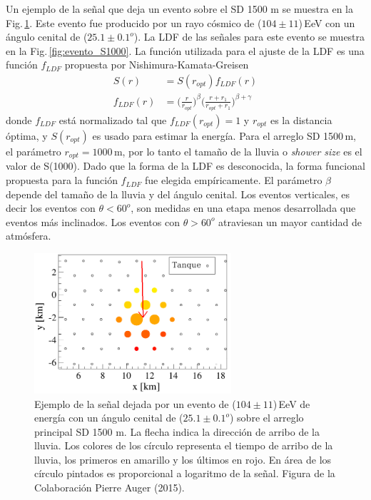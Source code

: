 Un ejemplo de la señal que deja un evento sobre el SD 1500 m se muestra en la Fig.\,\ref{fig:evento_sd}. Este evento fue producido por un rayo cósmico de ($104\pm11$)\,EeV con un ángulo cenital de ($25.1\pm0.1 ^o$). La LDF de las señales para este evento se muestra en la Fig.\,\ref{fig:evento_S1000}. La función utilizada para el ajuste de la LDF es una función  $f_{LDF}$ propuesta por Nishimura-Kamata-Greisen \cite{data}
\begin{align*}
	S(r) &= S(r_{opt})f_{LDF}(r)\\
	f_{LDF}(r)&=\bigg(\frac{r}{r_{opt}}\bigg)^{\beta}\bigg(\frac{r+r_1}{r_{opt}+r_1}\bigg)^{\beta + \gamma}
\end{align*}
donde $f_{LDF}$ está normalizado tal que $f_{LDF}(r_{opt})=1$ y $r_{opt}$ es la distancia óptima, %
y $S(r_{opt})$ es usado para estimar la energía. Para el arreglo SD 1500\,m, el parámetro $r_{opt}=1000\,$m, por lo tanto el tamaño de la lluvia o \emph{shower size} es el valor de S(1000). Dado que la forma de la LDF es desconocida, la forma funcional propuesta para la función $f_{LDF}$ fue elegida empíricamente.  El parámetro $\beta$ depende del tamaño de la lluvia y del ángulo cenital. Los eventos verticales, es decir los eventos con $\theta < 60^o$, son medidas en una etapa menos desarrollada que eventos más inclinados. Los eventos con $\theta>60^o$ atraviesan un mayor cantidad de atmósfera.


\begin{figure}[H]
	\begin{small}
		\begin{center}
			\includegraphics[width=0.65\textwidth]{evento_sd.png}
		\end{center}
		\caption{Ejemplo de la señal dejada por un evento de ($104\pm11$)\,EeV de energía con un ángulo cenital de ($25.1\pm0.1 ^o$) sobre el arreglo principal SD 1500 m. La flecha indica la dirección de arribo de la lluvia. Los colores de los círculo representa el tiempo de arribo de la lluvia, los primeros en amarillo y los últimos en rojo. En área de los círculo pintados es proporcional a logaritmo de la señal. Figura de la Colaboración Pierre Auger (2015). } 	\label{fig:evento_sd}
	\end{small}
\end{figure}


